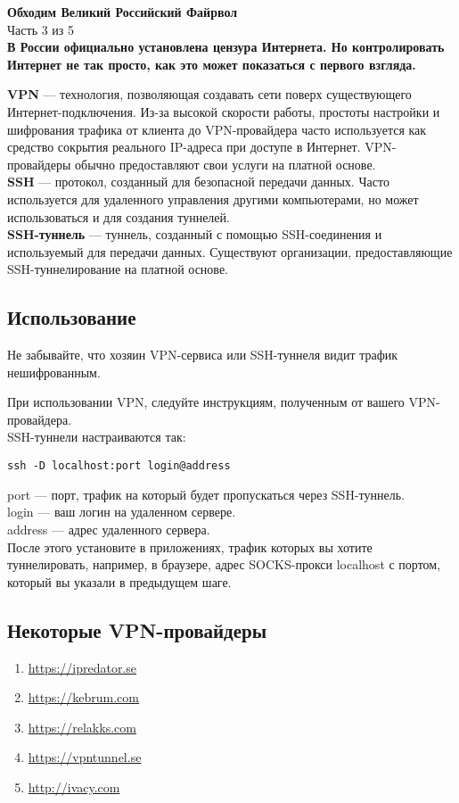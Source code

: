 \begin{center}
\LARGE \textbf{Обходим Великий Российский Файрвол}\\
\large Часть 3 из 5\\
\normalsize\textbf{В России официально установлена цензура Интернета. Но контролировать Интернет не так просто, как это может показаться с первого взгляда.}
\end{center}
\textbf{VPN} --- технология, позволяющая создавать сети поверх существующего Интернет-подключения. Из-за высокой скорости работы, простоты настройки и шифрования трафика от клиента до VPN-провайдера часто используется как средство сокрытия реального IP-адреса при доступе в Интернет. VPN-провайдеры обычно предоставляют свои услуги на платной основе.\\
\textbf{SSH} --- протокол, созданный для безопасной передачи данных. Часто используется для удаленного управления другими компьютерами, но может использоваться и для создания туннелей.\\
\textbf{SSH-туннель} --- туннель, созданный с помощью SSH-соединения и используемый для передачи данных. Существуют организации, предоставляющие SSH-туннелирование на платной основе.
\subsection*{Использование}
\begin{important}
Не забывайте, что хозяин VPN-сервиса или SSH-туннеля видит трафик нешифрованным.
\end{important}
При использовании VPN, следуйте инструкциям, полученным от вашего VPN-провайдера.\\
SSH-туннели настраиваются так:
\begin{lstlisting}
ssh -D localhost:port login@address
\end{lstlisting}
port --- порт, трафик на который будет пропускаться через SSH-туннель.\\
login --- ваш логин на удаленном сервере.\\
address --- адрес удаленного сервера.\\
После этого установите в приложениях, трафик которых вы хотите туннелировать, например, в браузере, адрес SOCKS-прокси localhost с портом, который вы указали в предыдущем шаге.
\subsection*{Некоторые VPN-провайдеры}
\begin{enumerate}
\item \url{https://ipredator.se}
\item \url{https://kebrum.com}
\item \url{https://relakks.com}
\item \url{https://vpntunnel.se}
\item \url{http://ivacy.com}
\end{enumerate}
